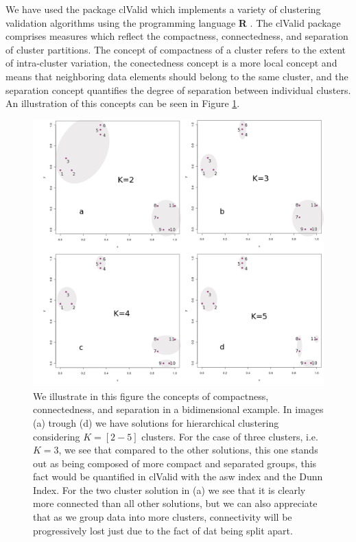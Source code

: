 We have  used the package clValid \cite{brock2008}  which implements a
variety  of  clustering validation  algorithms  using the  programming
language  \textbf{R}  \cite{rcite}.   The  clValid  package  comprises
measures which reflect  the compactness, connectedness, and separation
of cluster partitions. The concept  of compactness of a cluster refers
to the extent of  intra-cluster variation, the conectedness concept is
a more local  concept and means that neighboring  data elements should
belong to the same cluster, and the separation concept quantifies the
degree of separation between individual clusters. An illustration of
this concepts can be seen in Figure \ref{fig:concomsep}.

\begin{figure}
\centering
\includegraphics[scale=0.4]{Appendix/consilcom.png}
\caption{We  illustrate in  this figure  the concepts  of compactness,
  connectedness, and separation in a bidimensional example.  In images
  (a)  trough  (d)  we  have  solutions  for  hierarchical  clustering
  considering  $K=[2-5]$ clusters.   For the  case of  three clusters,
  i.e. $K=3$,  we see that compared  to the other  solutions, this one
  stands out as  being composed of more compact  and separated groups,
  this fact would be quantified in  clValid with the asw index and the
  Dunn Index.  For  the two cluster solution in (a) we  see that it is
  clearly more  connected than  all other solutions,  but we  can also
  appreciate that  as we group  data into more  clusters, connectivity
  will be progressively  lost just due to the fact  of dat being split
  apart.}
\label{fig:concomsep}
\end{figure}  

